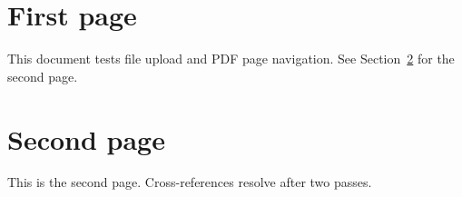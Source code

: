 \documentclass{article}
\begin{document}
\section{First page}
This document tests file upload and PDF page navigation.
See Section~\ref{sec:second} for the second page.
\newpage
\section{Second page}\label{sec:second}
This is the second page. Cross-references resolve after two passes.
\end{document}
